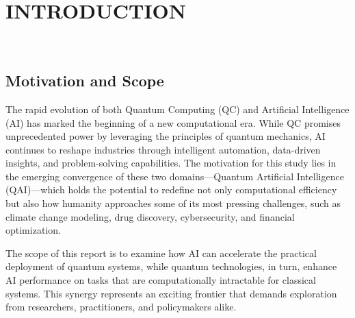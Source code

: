 \chapter{INTRODUCTION}\
\section{Motivation and Scope}
\hspace*{0.3in}The rapid evolution of both Quantum Computing (QC) and Artificial Intelligence (AI) has marked the beginning of a new computational era. While QC promises unprecedented power by leveraging the principles of quantum mechanics, AI continues to reshape industries through intelligent automation, data-driven insights, and problem-solving capabilities. The motivation for this study lies in the emerging convergence of these two domains—Quantum Artificial Intelligence (QAI)—which holds the potential to redefine not only computational efficiency but also how humanity approaches some of its most pressing challenges, such as climate change modeling, drug discovery, cybersecurity, and financial optimization.

The scope of this report is to examine how AI can accelerate the practical deployment of quantum systems, while quantum technologies, in turn, enhance AI performance on tasks that are computationally intractable for classical systems. This synergy represents an exciting frontier that demands exploration from researchers, practitioners, and policymakers alike.\\
